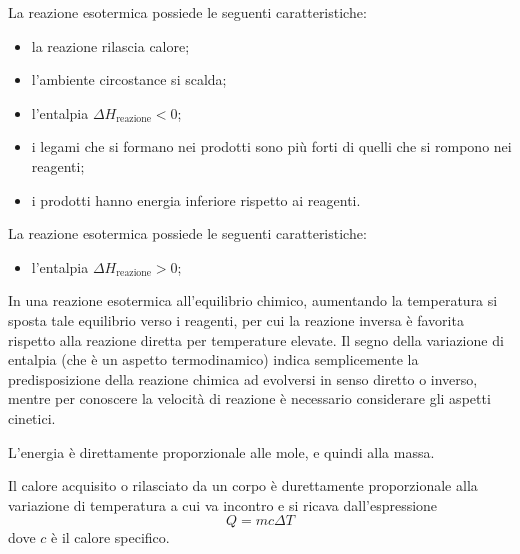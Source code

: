 \documentclass[a4paper]{article}
\begin{document}


La reazione esotermica possiede le seguenti caratteristiche:
\begin{itemize}
    \item la reazione rilascia calore;
    \item l'ambiente circostance si scalda;
    \item l'entalpia \(\Delta H_{\text{reazione}} < 0\);
    \item i legami che si formano nei prodotti sono più forti di quelli che si rompono nei reagenti;
    \item i prodotti hanno energia inferiore rispetto ai reagenti.
\end{itemize}


La reazione esotermica possiede le seguenti caratteristiche:
\begin{itemize}
    \item l'entalpia \(\Delta H_{\text{reazione}} > 0\);
\end{itemize}

In una reazione esotermica all'equilibrio chimico,
aumentando la temperatura si sposta tale equilibrio verso i reagenti,
per cui la reazione inversa è favorita rispetto alla reazione diretta
per temperature elevate. Il segno della variazione di entalpia
(che è un aspetto termodinamico) indica semplicemente la predisposizione della
reazione chimica ad evolversi in senso diretto o inverso,
mentre per conoscere la velocità di reazione è necessario considerare gli aspetti cinetici.

L'energia è direttamente proporzionale alle mole, e quindi alla massa.

Il calore acquisito o rilasciato da un corpo è durettamente proporzionale
alla variazione di temperatura a cui va incontro e si ricava dall'espressione
\[
    Q = mc\Delta T
\]
dove \(c\) è il calore specifico.

\end{document}
